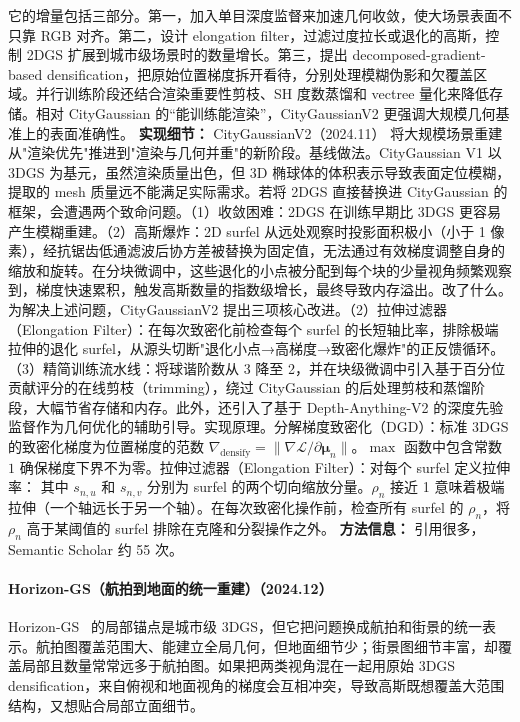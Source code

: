 它的增量包括三部分。第一，加入单目深度监督来加速几何收敛，使大场景表面不只靠 RGB 对齐。第二，设计 elongation filter，过滤过度拉长或退化的高斯，控制 2DGS 扩展到城市级场景时的数量增长。第三，提出 decomposed-gradient-based densification，把原始位置梯度拆开看待，分别处理模糊伪影和欠覆盖区域。并行训练阶段还结合渲染重要性剪枝、SH 度数蒸馏和 vectree 量化来降低存储。相对 CityGaussian 的“能训练能渲染”，CityGaussianV2 更强调大规模几何基准上的表面准确性。
\textbf{实现细节：} CityGaussianV2（2024.11） 将大规模场景重建从"渲染优先"推进到"渲染与几何并重"的新阶段。基线做法。CityGaussian V1 以 3DGS 为基元，虽然渲染质量出色，但 3D 椭球体的体积表示导致表面定位模糊，提取的 mesh 质量远不能满足实际需求。若将 2DGS 直接替换进 CityGaussian 的框架，会遭遇两个致命问题。（1）收敛困难：2DGS 在训练早期比 3DGS 更容易产生模糊重建。（2）高斯爆炸：2D surfel 从远处观察时投影面积极小（小于 1 像素），经抗锯齿低通滤波后协方差被替换为固定值，无法通过有效梯度调整自身的缩放和旋转。在分块微调中，这些退化的小点被分配到每个块的少量视角频繁观察到，梯度快速累积，触发高斯数量的指数级增长，最终导致内存溢出。改了什么。为解决上述问题，CityGaussianV2 提出三项核心改进。（2）拉伸过滤器（Elongation Filter）：在每次致密化前检查每个 surfel 的长短轴比率，排除极端拉伸的退化 surfel，从源头切断"退化小点→高梯度→致密化爆炸"的正反馈循环。（3）精简训练流水线：将球谐阶数从 3 降至 2，并在块级微调中引入基于百分位贡献评分的在线剪枝（trimming），绕过 CityGaussian 的后处理剪枝和蒸馏阶段，大幅节省存储和内存。此外，还引入了基于 Depth-Anything-V2 的深度先验监督作为几何优化的辅助引导。实现原理。分解梯度致密化（DGD）：标准 3DGS 的致密化梯度为位置梯度的范数 $\nabla_{\mathrm{densify}} = \|\nabla \mathcal{L} / \partial \boldsymbol{\mu}_n\|$。$\max$ 函数中包含常数 $1$ 确保梯度下界不为零。拉伸过滤器（Elongation Filter）：对每个 surfel 定义拉伸率： 其中 $s_{n,u}$ 和 $s_{n,v}$ 分别为 surfel 的两个切向缩放分量。$\rho_n$ 接近 1 意味着极端拉伸（一个轴远长于另一个轴）。在每次致密化操作前，检查所有 surfel 的 $\rho_n$，将 $\rho_n$ 高于某阈值的 surfel 排除在克隆和分裂操作之外。
\textbf{方法信息：} 引用很多，Semantic Scholar 约 55 次。



\paragraph{Horizon-GS（航拍到地面的统一重建）（2024.12）}
Horizon-GS~\cite{2412_01745} 的局部锚点是城市级 3DGS，但它把问题换成航拍和街景的统一表示。航拍图覆盖范围大、能建立全局几何，但地面细节少；街景图细节丰富，却覆盖局部且数量常常远多于航拍图。如果把两类视角混在一起用原始 3DGS densification，来自俯视和地面视角的梯度会互相冲突，导致高斯既想覆盖大范围结构，又想贴合局部立面细节。

